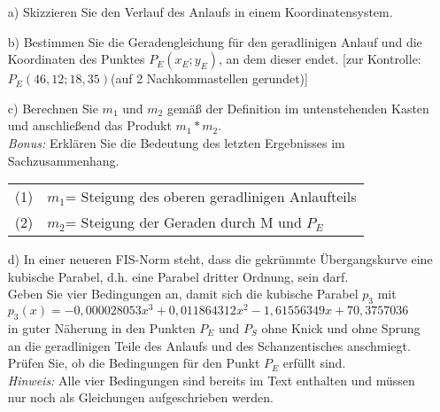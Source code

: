 	\begin{itemize}
		\item[a)]Skizzieren Sie den Verlauf des Anlaufs in einem Koordinatensystem.
		\item[b)]Bestimmen Sie die Geradengleichung für den geradlinigen Anlauf und die Koordinaten des Punktes \(P_E(x_E;y_E)\), an dem dieser endet. [zur Kontrolle: \(P_E(46,12;18,35)\)(auf 2 Nachkommastellen gerundet)]
		\item[c)]Berechnen Sie $m_1$ und $m_2$ gemäß der Definition im untenstehenden Kasten und anschließend das Produkt $m_1*m_2$.\\
		\textit{Bonus:} Erklären Sie die Bedeutung des letzten Ergebnisses im Sachzusammenhang.\\[-0,3cm]
		\begin{center}
			\begin{tabular}{|cl|} \hline
				(1) &	$m_1$= Steigung des oberen geradlinigen Anlaufteils\\
				(2)	&	$m_2$= Steigung der Geraden durch M und $P_E$\\ \hline
			\end{tabular}
		\end{center}
		\item[d)]In einer neueren FIS-Norm steht, dass die gekrümmte Übergangskurve eine kubische Parabel, d.h. eine Parabel dritter Ordnung, sein darf.\\
		Geben Sie vier Bedingungen an, damit sich die kubische Parabel $p_3$ mit\\[0,2cm]
		\(p_3(x)=-0,000028053x^3+0,011864312x^2-1,61556349x+70,3757036\) \\[0,2cm]
		in guter Näherung in den Punkten $P_E$ und $P_S$ ohne Knick und ohne Sprung an die geradlinigen Teile des Anlaufs und des Schanzentisches anschmiegt. Prüfen Sie, ob die Bedingungen für den Punkt $P_E$ erfüllt sind.\\[0,3cm]
		\textit{Hinweis:} Alle vier Bedingungen sind bereits im Text enthalten und müssen nur noch als Gleichungen aufgeschrieben werden.
	\end{itemize}
